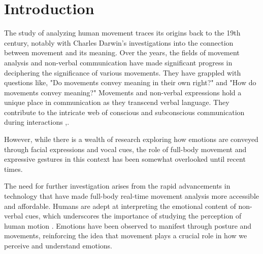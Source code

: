 \chapter{Introduction}
The study of analyzing human movement traces its origins back to the 19th century, notably with Charles Darwin's investigations into the connection between movement and its meaning. 
Over the years, the fields of movement analysis and non-verbal communication have made significant progress in deciphering the significance of various movements. 
They have grappled with questions like, "Do movements convey meaning in their own right?" and "How do movements convey meaning?"
Movements and non-verbal expressions hold a unique place in communication as they transcend verbal language. 
They contribute to the intricate web of conscious and subconscious communication during interactions \cite{Daly:1988},\cite{laffaye:2013}. 

However, while there is a wealth of research exploring how emotions are conveyed through facial expressions and vocal cues, the role of full-body movement and expressive gestures in this context has been somewhat overlooked until recent times.

The need for further investigation arises from the rapid advancements in technology that have made full-body real-time movement analysis more accessible and affordable. 
Humans are adept at interpreting the emotional content of non-verbal cues, which underscores the importance of studying the perception of human motion \cite{samadani:2011}. 
Emotions have been observed to manifest through posture and movements, reinforcing the idea that movement plays a crucial role in how we perceive and understand emotions.

